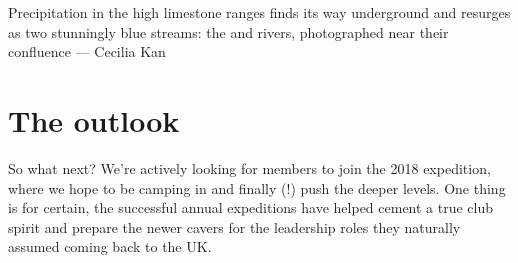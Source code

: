 \begin{marginfigure}
\vspace{-200pt}
	\checkoddpage \ifoddpage \forcerectofloat \else \forceversofloat \fi
	\centering
  	\caption{Precipitation in the high limestone ranges finds its way underground and resurges as two stunningly blue streams: the \protect{} and \protect{} rivers, photographed near their confluence --- Cecilia Kan}
	\end{marginfigure}

\section{The outlook}
So what next? We’re actively looking for members to join the 2018 expedition, where we hope to be camping in  and finally (!) push the deeper levels. One thing is for certain, the successful annual expeditions have helped cement a true club spirit and prepare the newer cavers for the leadership roles they naturally assumed coming back to the UK. 


